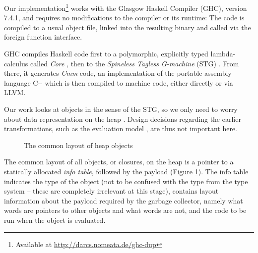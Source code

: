 \documentclass[preprint]{sigplanconf}
\theoremstyle{nonumberplain}
\begin{document}
Our implementation\footnote{Available at \url{http://darcs.nomeata.de/ghc-dup}} works with the Glasgow Haskell Compiler (GHC), version 7.4.1, and requires no modifications to the compiler or its runtime: The code is compiled to a usual object file, linked into the resulting binary and called via the foreign function interface.

GHC compiles Haskell code first to a polymorphic, explicitly typed lambda-calculus called \emph{Core} \citep{core,system-fc}, then to the \emph{Spineless Tagless G-machine} (STG) \citep{stg}. From there, it generates \emph{Cmm} code, an implementation of the portable assembly language C-{}- which is then compiled to machine code, either directly or via LLVM.

Our work looks at objects in the sense of the STG, so we only need to worry about data representation on the heap \citep{stg}. Design decisions regarding the earlier transformations, such as the evaluation model \cite{evalapply}, are thus not important here.

\def\ux{2.2cm}\def\uy{0.6cm}
\begin{figure}
\begin{center}
\end{center}
\caption{The common layout of heap objects}
\label{fig:heap}
\end{figure}

The common layout of all objects, or closures,  on the heap is a pointer to a statically allocated \emph{info table}, followed by the payload (Figure \ref{fig:heap}). The info table indicates the type of the object (not to be confused with the type from the type system – these are completely irrelevant at this stage), contains layout information about the payload required by the garbage collector, namely what words are pointers to other objects and what words are not, and the code to be run when the object is evaluated.
\end{document}

